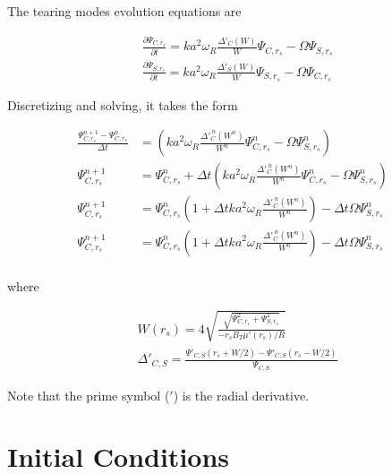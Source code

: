 \documentclass{article}
\begin{document}
The tearing modes evolution equations are

\begin{equation} \label{eq3}
\begin{split}
 & \frac{\partial \Psi_{C,r_s}}{\partial t} =k a^2 \omega_R \frac{\Delta'_C(W)}{W}\Psi_{C,r_s}-\Omega \Psi_{S,r_s} \\
  & \frac{\partial \Psi_{S,r_s}}{\partial t} =k a^2 \omega_R \frac{\Delta'_S(W)}{W}\Psi_{S,r_s}-\Omega \Psi_{C,r_s}
\end{split} 
\end{equation} 

Discretizing and solving, it takes the form


\begin{equation} \label{eq3}
\begin{split}
  \frac{\Psi_{C,r_s}^{n+1}-\Psi_{C,r_s}^{n}}{\Delta t} &=\left( k a^2 \omega_R \frac{\Delta'^{\ n}_{C}(W^n)}{W^n}\Psi_{C,r_s}^n-\Omega \Psi_{S,r_s}^n  \right ) \\
  \Psi_{C,r_s}^{n+1} &=\Psi_{C,r_s}^{n}+\Delta t \left( k a^2 \omega_R \frac{\Delta'^{\ n}_C(W^{n})}{W^{n}}\Psi_{C,r_s}^{n}-\Omega \Psi_{S,r_s}^{n} \right )  \\ 
   \Psi_{C,r_s}^{n+1} &=\Psi_{C,r_s}^{n}\left( 1 + \Delta t  k a^2 \omega_R \frac{\Delta'^{\ n}_C(W^{n})}{W^{n}}\right) - \Delta t \Omega \Psi_{S,r_s}^{n}   \\
      \Psi_{C,r_s}^{n+1} &=\Psi_{C,r_s}^{n}\left( 1 + \Delta t  k a^2 \omega_R \frac{\Delta'^{\ n}_C(W^{n})}{W^{n}}\right) - \Delta t \Omega \Psi_{S,r_s}^{n}   \\
\end{split} 
\end{equation} 

where



\begin{equation} \label{eq3}
\begin{split}
 & W(r_s) = 4 \sqrt{\frac{\sqrt{\Psi^2_{C,r_s} + \Psi^2_{S,r_s}}}{-r_sB_T\mu'(r_s)/R} }\\
  & \Delta'_{C,S}=\frac{\Psi'_{C,S}(r_s+W/2)-\Psi'_{C,S}(r_s-W/2)}{\Psi_{C,S}}
\end{split} 
\end{equation} 

Note that the prime symbol ($'$) is the radial derivative.  


\section{Initial Conditions}
\end{document}
